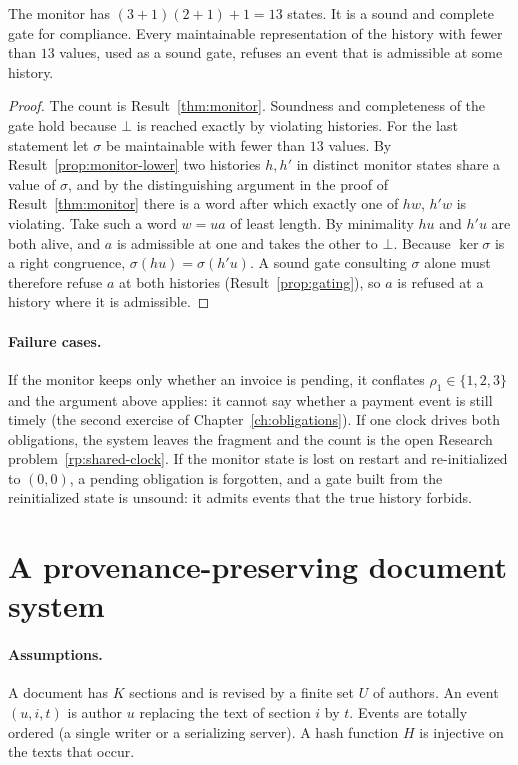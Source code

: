 \begin{newresult}\label{prop:worked-monitor}
The monitor has $(3+1)(2+1)+1=13$ states. It is a sound and complete gate for compliance. Every maintainable representation of the history with fewer than $13$ values, used as a sound gate, refuses an event that is admissible at some history.
\end{newresult}
\begin{proof}
The count is Result~\ref{thm:monitor}. Soundness and completeness of the gate hold because $\bot$ is reached exactly by violating histories. For the last statement let $\sigma$ be maintainable with fewer than $13$ values. By Result~\ref{prop:monitor-lower} two histories $h,h'$ in distinct monitor states share a value of $\sigma$, and by the distinguishing argument in the proof of Result~\ref{thm:monitor} there is a word after which exactly one of $hw$, $h'w$ is violating. Take such a word $w=ua$ of least length. By minimality $hu$ and $h'u$ are both alive, and $a$ is admissible at one and takes the other to $\bot$. Because $\ker\sigma$ is a right congruence, $\sigma(hu)=\sigma(h'u)$. A sound gate consulting $\sigma$ alone must therefore refuse $a$ at both histories (Result~\ref{prop:gating}), so $a$ is refused at a history where it is admissible.\end{proof}

\paragraph{Failure cases.} If the monitor keeps only whether an invoice is pending, it conflates $\rho_1\in\{1,2,3\}$ and the argument above applies: it cannot say whether a payment event is still timely (the second exercise of Chapter~\ref{ch:obligations}). If one clock drives both obligations, the system leaves the fragment and the count is the open Research problem~\ref{rp:shared-clock}. If the monitor state is lost on restart and re-initialized to $(0,0)$, a pending obligation is forgotten, and a gate built from the reinitialized state is unsound: it admits events that the true history forbids.

\section{A provenance-preserving document system}

\paragraph{Assumptions.} A document has $K$ sections and is revised by a finite set $U$ of authors. An event $(u,i,t)$ is author $u$ replacing the text of section $i$ by $t$. Events are totally ordered (a single writer or a serializing server). A hash function $H$ is injective on the texts that occur.

